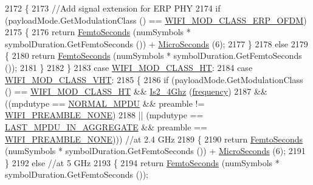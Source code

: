 \begin{DoxyCode}
2172       \{
2173         \textcolor{comment}{//Add signal extension for ERP PHY}
2174         \textcolor{keywordflow}{if} (payloadMode.GetModulationClass () == \hyperlink{namespacens3_aa999e1221606a2b21b1eb33c2007c217afc1f5ef8d2c985f37a3224dd86ab014d}{WIFI\_MOD\_CLASS\_ERP\_OFDM})
2175           \{
2176             \textcolor{keywordflow}{return} \hyperlink{group__timecivil_ga7df0af9e3ea0a71baeba0fbde1c54943}{FemtoSeconds} (numSymbols * symbolDuration.GetFemtoSeconds ()) + 
      \hyperlink{group__timecivil_ga17465a639c8d1464e76538afdd78a9f0}{MicroSeconds} (6);
2177           \}
2178         \textcolor{keywordflow}{else}
2179           \{
2180             \textcolor{keywordflow}{return} \hyperlink{group__timecivil_ga7df0af9e3ea0a71baeba0fbde1c54943}{FemtoSeconds} (numSymbols * symbolDuration.GetFemtoSeconds ());
2181           \}
2182       \}
2183     \textcolor{keywordflow}{case} \hyperlink{namespacens3_aa999e1221606a2b21b1eb33c2007c217a6ac45cac36cc4454649435d24ebf349c}{WIFI\_MOD\_CLASS\_HT}:
2184     \textcolor{keywordflow}{case} \hyperlink{namespacens3_aa999e1221606a2b21b1eb33c2007c217a9863e4342bf5c238c74dddfc4d96c67e}{WIFI\_MOD\_CLASS\_VHT}:
2185       \{
2186         \textcolor{keywordflow}{if} (payloadMode.GetModulationClass () == \hyperlink{namespacens3_aa999e1221606a2b21b1eb33c2007c217a6ac45cac36cc4454649435d24ebf349c}{WIFI\_MOD\_CLASS\_HT} && 
      \hyperlink{classns3_1_1WifiPhy_aaa5c580b1df6a1a17c45d4499cdde989}{Is2\_4Ghz} (\hyperlink{lte_2model_2fading-traces_2fading__trace__generator_8m_a09045328d6d7e16aa4013f526cc6993d}{frequency})
2187             && ((mpdutype == \hyperlink{namespacens3_ae617d41bbd0c07fa58ee2306f687b055a1fa7c2077d3b19b000b35004914f50eb}{NORMAL\_MPDU} && preamble != 
      \hyperlink{group__wifi_gga5e94a56cb338a14ffbbb19c6a41251eba97c5c71995de5f28931200e6d5a38a66}{WIFI\_PREAMBLE\_NONE})
2188                 || (mpdutype == \hyperlink{namespacens3_ae617d41bbd0c07fa58ee2306f687b055a00f5645550d1d4766ba10c4ac229b276}{LAST\_MPDU\_IN\_AGGREGATE} && preamble == 
      \hyperlink{group__wifi_gga5e94a56cb338a14ffbbb19c6a41251eba97c5c71995de5f28931200e6d5a38a66}{WIFI\_PREAMBLE\_NONE}))) \textcolor{comment}{//at 2.4 GHz}
2189           \{
2190             \textcolor{keywordflow}{return} \hyperlink{group__timecivil_ga7df0af9e3ea0a71baeba0fbde1c54943}{FemtoSeconds} (numSymbols * symbolDuration.GetFemtoSeconds ()) + 
      \hyperlink{group__timecivil_ga17465a639c8d1464e76538afdd78a9f0}{MicroSeconds} (6);
2191           \}
2192         \textcolor{keywordflow}{else} \textcolor{comment}{//at 5 GHz}
2193           \{
2194             \textcolor{keywordflow}{return} \hyperlink{group__timecivil_ga7df0af9e3ea0a71baeba0fbde1c54943}{FemtoSeconds} (numSymbols * symbolDuration.GetFemtoSeconds ());

\end{DoxyCode}
